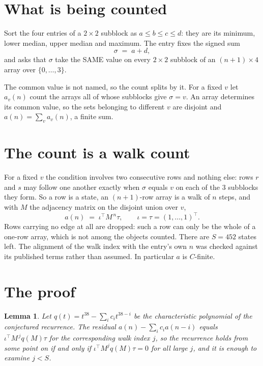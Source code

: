 \documentclass[11pt,a4paper]{article}
\theoremstyle{plain}
\newtheorem{lemma}[theorem]{Lemma}
\theoremstyle{definition}
\begin{document}
\section{What is being counted}

Sort the four entries of a $2\times2$ subblock as $a\le b\le c\le d$: they
are its minimum, lower median, upper median and maximum. The entry fixes the signed sum
\[
\sigma\;=\;a+d,
\]
and asks that $\sigma$ take the SAME value on every $2\times2$ subblock of an
$(n+1)\times4$ array over $\{0,\dots,3\}$.

The common value is not named, so the count splits by it. For a fixed $v$ let $a_v(n)$ count
the arrays all of whose subblocks give $\sigma=v$. An array determines its common value, so
the sets belonging to different $v$ are disjoint and $a(n)=\sum_v a_v(n)$, a finite sum.


\section{The count is a walk count}

For a fixed $v$ the condition involves two consecutive rows and nothing
else: rows $r$ and $s$ may follow one another exactly when $\sigma$ equals $v$ on each of the
$3$ subblocks they form. So a row is a state, an $(n+1)$-row array is a walk of $n$
steps, and with $M$ the adjacency matrix on the disjoint union over $v$,
\[
a(n)\;=\;\iota^{\!\top}M^{\,n}\tau,\qquad\iota=\tau=(1,\dots,1)^{\!\top} .
\]
Rows carrying no edge at all are dropped: such a row can only be the whole of a one-row
array, which is not among the objects counted. There are $S=452$ states left.
The alignment of the walk index with the entry's own $n$ was checked against its published
terms rather than assumed. In particular $a$ is $C$-finite.

\section{The proof}

\begin{lemma}\label{lem:crit}
Let $q(t)=t^{38}-\sum_i c_it^{38-i}$ be the characteristic polynomial of the
conjectured recurrence. The residual $a(n)-\sum_ic_ia(n-i)$ equals
$\iota^{\!\top}M^{\,j}q(M)\tau$ for the corresponding walk index $j$, so the recurrence
holds from some point on if and only if $\iota^{\!\top}M^{j}q(M)\tau=0$ for all large $j$,
and it is enough to examine $j<S$.
\end{lemma}
\end{document}
